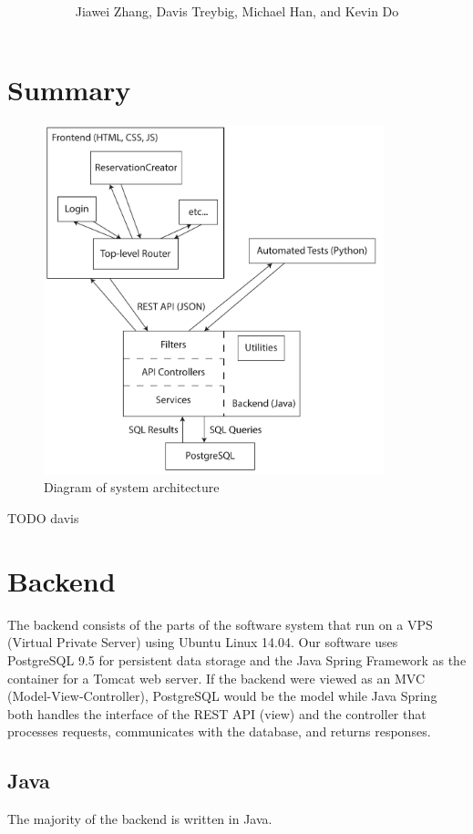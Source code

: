 \documentclass[12pt]{article}
\title{\horrule{5pt}\\\vspace{0.4cm}{\bf \mytitle}\\}
\author{Jiawei Zhang, Davis Treybig, Michael Han, and Kevin Do}
\date{\horrule{1pt}}
\begin{document}
\maketitle{}
\section{Summary}
\begin{figure}[h]
\begin{center}
\includegraphics[height=4in]{design_cropped.pdf}
\end{center}
\caption{Diagram of system architecture}
\label{fig:design}
\end{figure}
TODO davis

\section{Backend}
The backend consists of the parts of the software system that run on a VPS (Virtual Private Server) using Ubuntu Linux 14.04. Our software uses PostgreSQL 9.5 for persistent data storage and the Java Spring Framework as the container for a Tomcat web server. If the backend were viewed as an MVC (Model-View-Controller), PostgreSQL would be the model while Java Spring both handles the interface of the REST API (view) and the controller that processes requests, communicates with the database, and returns responses. 

\subsection{Java}
The majority of the backend is written in Java. 
\end{document}
